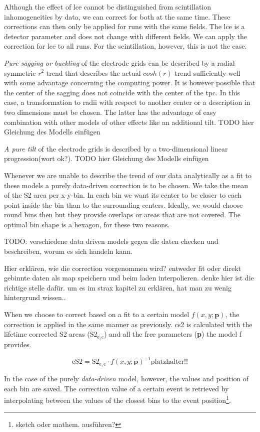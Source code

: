 Although the effect of \gls{lce} cannot be distinguished from scintillation inhomogeneities by data, we can correct for both at the same time.
These corrections can then only be applied for runs with the same fields.
The \gls{lce} is a detector parameter and does not change with different fields.
We can apply the correction for \gls{lce} to all runs.
For the scintillation, however, this is not the case.




\emph{Pure sagging or buckling} of the electrode grids can be described by a radial symmetric $ r^2 $ trend that describes the actual $ cosh\left( r \right) $ trend sufficiently well with some advantage concerning the computing power.
It is however possible that the center of the sagging does not coincide with the center of the \gls{tpc}.
In this case, a transformation to radii with respect to another center or a description in two dimensions must be chosen.
The latter has the advantage of easy combination with other models of other effects like an additional tilt.
TODO hier Gleichung des Modells einfügen

\emph{A pure tilt} of the electrode grids is described by a two-dimensional linear progression(wort ok?).
TODO hier Gleichung des Modells einfügen

Whenever we are unable to describe the trend of our data analytically as a fit to these models a purely data-driven correction is to be chosen.
We take the mean of the S2 area per x-y-bin.
In each bin we want its center to be closer to each point inside the bin than to the surrounding centers.
Ideally, we would choose round bins then but they provide overlaps or areas that are not covered.
The optimal bin shape is a hexagon, for these two reasons.

TODO: verschiedene data driven models gegen die daten checken und beschreiben, worum es sich handeln kann.


Hier erklären, wie die correction vorgenommen wird? entweder fit oder direkt gebinnte daten als map speichern und beim laden interpolieren. denke hier ist die richtige stelle dafür. um es im strax kapitel zu erklären, hat man zu wenig hintergrund wissen..

When we choose to correct based on a fit to a certain model $ f\left( x,y;\mathbf{p} \right) $, the correction is applied in the same manner as previously. \gls{cs2} is calculated with the lifetime corrected S2 areas ($ \mathrm{S2_\mathrm{e_\tau c}} $) and all the free parameters (\textbf{p}) the model f provides.

\begin{equation} %
    \mathrm{cS2} = \mathrm{S2_\mathrm{e_\tau c}} \cdot f\left( x,y; \mathbf{p} \right)^{-1} \mathrm{platzhalter!!}
    \label{eq:cs2}
\end{equation}

In the case of the purely \emph{data-driven} model, however, the values and position of each bin are saved.
The correction value of a certain event is retrieved by interpolating between the values of the closest bins to the event position\footnote{sketch oder mathem. ausführen?}.


